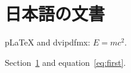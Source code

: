 \documentclass{jsarticle}
\begin{document}
\section{日本語の文書}\label{sec:first}
pLaTeX and dvipdfmx: $E=mc^2$.

\newpage
Section~\ref{sec:first} and equation~\ref{eq:first}.
\end{document}
